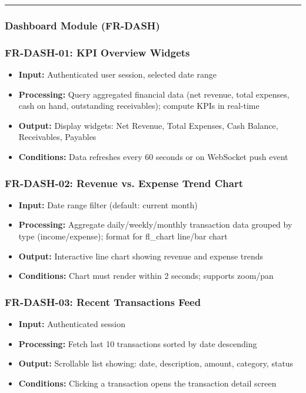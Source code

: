\documentclass[journal, a4paper, onecolumn, 12pt]{IEEEtran}
\begin{document}
\vspace{1em}\hrule\vspace{1em}

\subsubsection{Dashboard Module (FR-DASH)}

\subsubsection{FR-DASH-01: KPI Overview Widgets}
\begin{itemize}[leftmargin=*]
\item \textbf{Input:} Authenticated user session, selected date range
\item \textbf{Processing:} Query aggregated financial data (net revenue, total expenses, cash on hand, outstanding receivables); compute KPIs in real-time
\item \textbf{Output:} Display widgets: Net Revenue, Total Expenses, Cash Balance, Receivables, Payables
\item \textbf{Conditions:} Data refreshes every 60 seconds or on WebSocket push event
\end{itemize}

\subsubsection{FR-DASH-02: Revenue vs. Expense Trend Chart}
\begin{itemize}[leftmargin=*]
\item \textbf{Input:} Date range filter (default: current month)
\item \textbf{Processing:} Aggregate daily/weekly/monthly transaction data grouped by type (income/expense); format for fl\_chart line/bar chart
\item \textbf{Output:} Interactive line chart showing revenue and expense trends
\item \textbf{Conditions:} Chart must render within 2 seconds; supports zoom/pan
\end{itemize}

\subsubsection{FR-DASH-03: Recent Transactions Feed}
\begin{itemize}[leftmargin=*]
\item \textbf{Input:} Authenticated session
\item \textbf{Processing:} Fetch last 10 transactions sorted by date descending
\item \textbf{Output:} Scrollable list showing: date, description, amount, category, status
\item \textbf{Conditions:} Clicking a transaction opens the transaction detail screen
\end{itemize}
\end{document}

